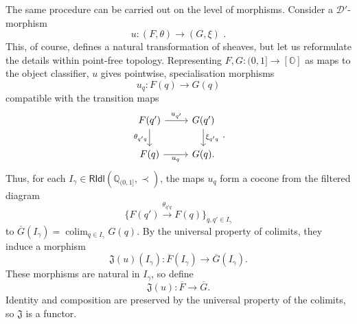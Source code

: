 \documentclass[a4paper, 11pt,reqno]{amsart}
\newcommand{\calD}{{\mathcal{D}}}
\newcommand{\qint}{\mathbb{Q}_{(0,1]}}
\newcommand{\RIdl}{\mathsf{RIdl}}
\DeclareMathOperator*{\colim}{colim}
\begin{document}
The same procedure can be carried out on the level of morphisms. Consider a $\calD'$-morphism
$$
u\colon(F,\theta)\longrightarrow(G,\xi)\,\,.
$$
This, of course, defines a natural transformation of sheaves, but let us reformulate the details within point-free topology. Representing $F,G\colon (0,1]\rightarrow[\mathbb{O}]$ as maps to the object classifier, $u$ gives pointwise, specialisation morphisms
$$
u_q\colon F(q)\longrightarrow G(q)
$$
compatible with the transition maps
$$
\begin{tikzcd}
F(q') \ar[r,"u_{q'}"] \ar[d,swap,"\theta_{q'q}"]&
G(q') \ar[d,"\xi_{q'q}"]\\
F(q) \ar[r,swap,"u_q"]&
G(q).
\end{tikzcd}\,.
$$
Thus, for each $I_\gamma\in\RIdl(\qint,\prec)$, the maps $u_q$ form a cocone from the filtered diagram
$$
\{F(q')\xrightarrow{\theta_{q'q}}F(q)\}_{q,q'\in I_\gamma}
$$
to $\overline G(I_\gamma)=\colim_{q\in I_\gamma}G(q)$. By the universal property of colimits, they induce a morphism
$$
\mathfrak J(u)(I_\gamma)\colon
\overline F(I_\gamma)
\longrightarrow
\overline G(I_\gamma).
$$
These morphisms are natural in $I_\gamma$, so define
$$
\mathfrak J(u)\colon\overline F\longrightarrow\overline G.
$$
Identity and composition are preserved by the universal property of the colimits, so $\mathfrak J$ is a functor.
\end{document}
